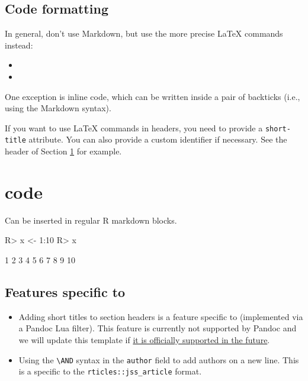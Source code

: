 \documentclass[
]{jss}
\providecommand{\tightlist}{%
  \setlength{\itemsep}{0pt}\setlength{\parskip}{0pt}}
\begin{document}
\hypertarget{code-formatting}{%
\subsection{Code formatting}\label{code-formatting}}

In general, don't use Markdown, but use the more precise LaTeX commands
instead:

\begin{itemize}
\item
\item
\end{itemize}

One exception is inline code, which can be written inside a pair of
backticks (i.e., using the Markdown syntax).

If you want to use LaTeX commands in headers, you need to provide a
\texttt{short-title} attribute. You can also provide a custom identifier
if necessary. See the header of Section \ref{r-code} for example.

\section[R code]{ code}\label{r-code}

Can be inserted in regular R markdown blocks.

\begin{CodeChunk}
\begin{CodeInput}
R> x <- 1:10
R> x
\end{CodeInput}
\begin{CodeOutput}
 [1]  1  2  3  4  5  6  7  8  9 10
\end{CodeOutput}
\end{CodeChunk}

\subsection[Features specific to rticles]{Features specific to
}\label{features-specific-to}

\begin{itemize}
\tightlist
\item
  Adding short titles to section headers is a feature specific to
   (implemented via a Pandoc Lua filter). This feature is
  currently not supported by Pandoc and we will update this template if
  \href{https://github.com/jgm/pandoc/issues/4409}{it is officially
  supported in the future}.
\item
  Using the \texttt{\textbackslash{}AND} syntax in the \texttt{author}
  field to add authors on a new line. This is a specific to the
  \texttt{rticles::jss\_article} format.
\end{itemize}


\end{document}

